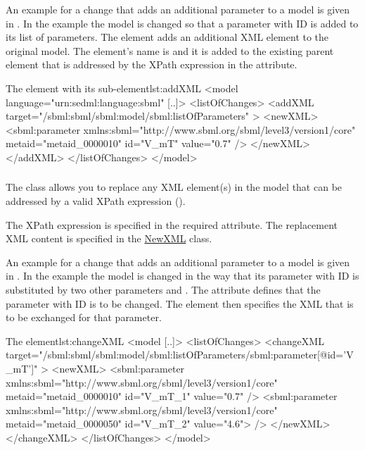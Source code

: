 An example for a change that adds an additional parameter to a model is given in . In the example the model is changed so that a parameter with ID  is added to its list of parameters. The  element adds an additional XML element to the original model. The element's name is  and it is added to the existing parent element  that is addressed by the XPath expression in the  attribute.

\begin{myXmlLst}{The  element with its  sub-element}{lst:addXML}
<model language="urn:sedml:language:sbml" [..]>
	<listOfChanges>
		<addXML target="/sbml:sbml/sbml:model/sbml:listOfParameters" >
			<newXML>
				<sbml:parameter xmlns:sbml="http://www.sbml.org/sbml/level3/version1/core"
				                metaid="metaid_0000010" id="V_mT" value="0.7" />
			</newXML>
		</addXML>
	</listOfChanges>
</model>
\end{myXmlLst}


\subsubsection{}
\label{class:changeXml}
The  class allows you to replace any XML element(s) in the model that can be addressed by a valid XPath expression ().

The XPath expression is specified in the required \hyperref[sec:changeTarget]{} attribute. The replacement XML content is specified in the \hyperref[sec:newXml]{NewXML} class.

An example for a change that adds an additional parameter to a model is given in . In the example the model is changed in the way that its parameter with ID  is substituted by two other parameters  and . The  attribute defines that the parameter with ID  is to be changed. The  element then specifies the XML that is to be exchanged for that parameter.

\begin{myXmlLst}{The  element}{lst:changeXML}
<model [..]>
	<listOfChanges>
		<changeXML target="/sbml:sbml/sbml:model/sbml:listOfParameters/sbml:parameter[@id='V_mT']" >
			<newXML>
				<sbml:parameter xmlns:sbml="http://www.sbml.org/sbml/level3/version1/core"
				                metaid="metaid_0000010" id="V_mT_1" value="0.7" />
				<sbml:parameter xmlns:sbml="http://www.sbml.org/sbml/level3/version1/core"
				                metaid="metaid_0000050" id="V_mT_2" value="4.6"> />
			</newXML>
		</changeXML>
	</listOfChanges>
</model>
\end{myXmlLst}



